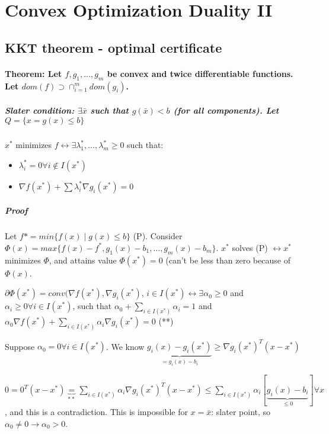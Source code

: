 \documentclass[main]{subfiles}
\begin{document}

\section{Convex Optimization Duality II}

\subsection{KKT theorem - optimal certificate}
\paragraph{Theorem: Let $f, g_{1}, \dots, g_{m}$ be convex and twice differentiable functions. Let $dom(f) \supset \cap_{i = 1}^{m} dom (g_{i})$.}

\subparagraph{Slater condition: $\exists \bar{x}$ such that $ g( \bar{x} ) < b$ (for all components). Let $Q = \{ x = g(x) \leq b \}$ }

$x^{*}$ minimizes $f \leftrightarrow \exists \lambda^{*}_{1}, \dots, \lambda^{*}_{m} \geq 0$ such that:
\begin{itemize}
\item $\lambda^{*}_{i} = 0 \forall i \notin I(x^{*})$
\item $\nabla f(x^{*}) + \sum \lambda^{*}_{i} \nabla g_{i}(x^{*}) = 0$
\end{itemize}

\subparagraph{Proof}
Let $f{*} = min \{ f(x) \mid g(x) \leq b \}$ (P). Consider $\Phi (x) = max \{ f(x) - f^{*}, g_{1}(x)-b_{1}, \dots, g_{m}(x)-b_{m} \}$. $x^{*}$ solves (P) $\leftrightarrow x^{*}$ minimizes $\Phi$, and attains value $\Phi (x^{*}) =0$ (can't be less than zero because of $\Phi(x)$.

$\partial \Phi (x^{*}) = conv(\nabla f(x^{*}), \nabla g_{i}(x^{*})$, $i \in I(x^{*}) \leftrightarrow \exists \alpha_{0} \geq 0$ and $\alpha_{i} \geq 0 \forall i \in I(x^{*})$, such that $\alpha_{0} + \sum_{i \in I(x^{*})} \alpha_{i} = 1$ and $\alpha_{0} \nabla f(x^{*}) + \sum_{i \in I(x^{*})} \alpha_{i} \nabla g_{i}(x^{*}) = 0$ (**)

Suppose $\alpha_{0} = 0 \forall i \in I(x^{*})$. We know $\underbrace{g_{i}(x) - g_{i}(x^{*})}_{= g_{i}(x) -b_{i}} \geq \nabla g_{i}(x^{*})^{T}(x - x^{*})$

$0 = 0^{T}(x-x^{*}) \underbrace{=}_{**} \sum_{i \in I(x^{*})} \alpha_{i} \nabla g_{i}(x^{*})^{T}(x-x^{*}) \leq \sum_{i \in I(x^{*})} \alpha_{i} [\underbrace{g_{i}(x)-b_{i}}_{\leq 0}] \forall x$, and this is a contradiction. This is impossible for $x = \bar{x}$: slater point, so $\alpha_{0} \neq 0 \rightarrow \alpha_{0} > 0$.
\end{document}
